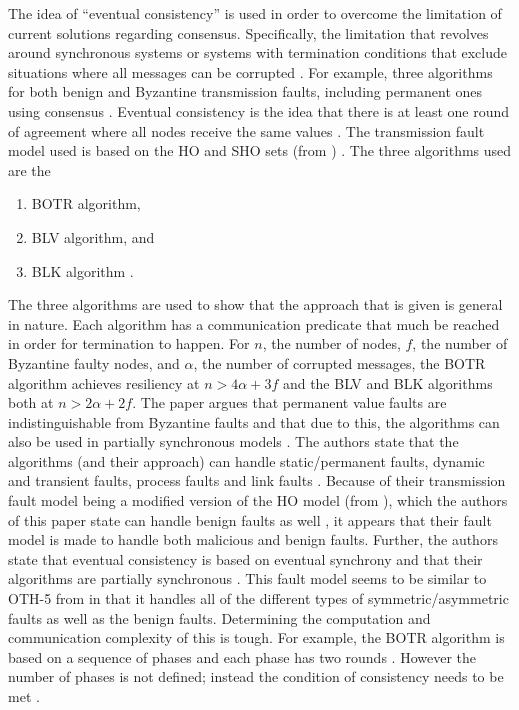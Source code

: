 \documentclass[twoside, conference]{IEEEtran}%
\begin{document}
The idea of  ``eventual consistency'' is used in order to overcome the limitation of current solutions regarding consensus.  Specifically, the limitation that revolves around synchronous systems or systems with termination conditions that exclude situations where all messages can be corrupted \cite{Milosevic2014}.  For example, three algorithms for both benign and Byzantine transmission faults, including permanent ones using consensus \cite{Milosevic2014}.  Eventual consistency is the idea that there is at least one round of agreement where all nodes receive the same values \cite{Milosevic2014}.  The transmission fault model used is based on the HO and SHO sets (from \cite{Biely2007}) \cite{Milosevic2014}.  The three algorithms used are the 
\begin{enumerate}
	\item BOTR algorithm,
	\item BLV algorithm, and
	\item BLK algorithm \cite{Milosevic2014}.
\end{enumerate}
The three algorithms are used to show that the approach that is given is general in nature.  Each algorithm has a communication predicate that much be reached in order for termination to happen.  For $n$, the number of nodes, $f$, the number of Byzantine faulty nodes, and $\alpha$, the number of corrupted messages, the BOTR algorithm achieves resiliency at $n > 4\alpha + 3f$ and the BLV and BLK algorithms both at $n > 2\alpha + 2f$\cite{Milosevic2014}.  The paper argues that permanent value faults are indistinguishable from Byzantine faults and that due to this, the algorithms can also be used in partially synchronous models \cite{Milosevic2014}.  The authors state that the algorithms (and their approach) can handle static/permanent faults, dynamic and transient faults, process faults and link faults \cite{Milosevic2014}.  Because of their transmission fault model being a modified version of the HO model (from \cite{Biely2007}), which the authors of this paper state can handle benign faults as well \cite{Milosevic2014}, it appears that their fault model is made to handle both malicious and benign faults.  Further, the authors state that eventual consistency is based on eventual synchrony \cite{Milosevic2014} and that their algorithms are partially synchronous \cite{Milosevic2014}.  This fault model seems to be similar to OTH-5 from \cite{Azadmanesh2000} in that it handles all of the different types of symmetric/asymmetric faults as well as the benign faults.  Determining the computation and communication complexity of this is tough.  For example, the BOTR algorithm is based on a sequence of phases and each phase has two rounds \cite{Milosevic2014}.  However the number of phases is not defined; instead the condition of consistency needs to be met \cite{Milosevic2014}.
\end{document}
